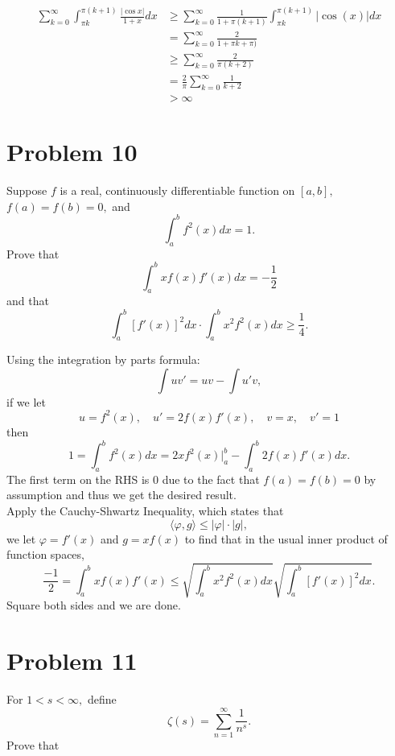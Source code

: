 \documentclass[11pt]{article}
\begin{document}
\begin{solution}
    \begin{align*}
        \sum_{k=0}^\infty \int_{\pi k}^{\pi(k+1)}\frac{|\cos x|}{1 + x} dx &\geq \sum_{k=0}^{\infty}\frac{1}{1 + \pi(k+1)}\int_{\pi k}^{\pi(k+1)}|\cos(x)|dx\\
        &= \sum_{k=0}^\infty \frac{2}{1 + \pi k + \pi)}\\
        &\geq \sum_{k=0}^\infty \frac{2}{\pi (k+2)}\\
        &= \frac{2}{\pi}\sum_{k=0}^\infty \frac{1}{k+2}\\
        &> \infty
    \end{align*}
\end{solution}


\newpage
\section*{Problem 10}
\begin{problem}
    Suppose $f$ is a real, continuously differentiable function on $[a,b],$ $f(a) = f(b) = 0,$ and 
    \[\int_a^bf^2(x)dx = 1.\] Prove that 
    \[\int_a^b xf(x)f'(x)dx = -\frac{1}{2}\]
    and that 
    \[\int_a^b[f'(x)]^2dx \cdot \int_a^b x^2 f^2(x)dx \geq \frac{1}{4}.\]
\end{problem}
\begin{solution}
    Using the integration by parts formula:
    \[\int uv' = uv - \int u'v,\] if we let
    \[u = f^2(x), \quad u' = 2f(x)f'(x), \quad v = x, \quad v' = 1\]
    then
    \[1 = \int_a^b f^2(x)dx = 2xf^2(x)|_a^b - \int_a^b 2f(x)f'(x)dx.\] The first term on the RHS is $0$ due to the fact that $f(a) = f(b) = 0$ by assumption and thus we get the desired result.\\
    Apply the Cauchy-Shwartz Inequality, which states that 
    \[\langle \varphi, g\rangle\leq |\varphi| \cdot |g|,\] we let $\varphi = f'(x)$ and $g = xf(x)$ to find that in the usual inner product of function spaces,
    \[\frac{-1}{2} = \int_a^b xf(x)f'(x)\leq \sqrt{\int_a^bx^2f^2(x)dx} \sqrt{\int_a^b[f'(x)]^2dx}.\] Square both sides and we are done.
\end{solution}

\newpage
\section*{Problem 11}
\begin{problem}
    For $1< s< \infty,$ define 
    \[\zeta(s) = \sum_{n=1}^\infty \frac{1}{n^s}.\] Prove that 
    \end{problem}
\end{document}
